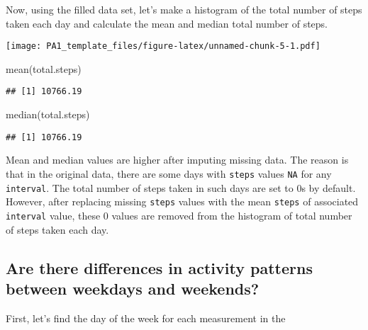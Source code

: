 \documentclass[
]{article}
\newenvironment{Shaded}{\begin{snugshade}}{\end{snugshade}}
\newcommand{\AttributeTok}[1]{\textcolor[rgb]{0.77,0.63,0.00}{#1}}
\newcommand{\DecValTok}[1]{\textcolor[rgb]{0.00,0.00,0.81}{#1}}
\newcommand{\FunctionTok}[1]{\textcolor[rgb]{0.00,0.00,0.00}{#1}}
\newcommand{\NormalTok}[1]{#1}
\newcommand{\OtherTok}[1]{\textcolor[rgb]{0.56,0.35,0.01}{#1}}
\newcommand{\SpecialCharTok}[1]{\textcolor[rgb]{0.00,0.00,0.00}{#1}}
\newcommand{\StringTok}[1]{\textcolor[rgb]{0.31,0.60,0.02}{#1}}
\begin{document}
Now, using the filled data set, let's make a histogram of the total
number of steps taken each day and calculate the mean and median total
number of steps.
\begin{Shaded}
\end{Shaded}
\texttt{[image: PA1\_template\_files/figure-latex/unnamed-chunk-5-1.pdf]}
\begin{Shaded}
\begin{Highlighting}[]
\FunctionTok{mean}\NormalTok{(total.steps)}
\end{Highlighting}
\end{Shaded}
\begin{verbatim}
## [1] 10766.19
\end{verbatim}
\begin{Shaded}
\begin{Highlighting}[]
\FunctionTok{median}\NormalTok{(total.steps)}
\end{Highlighting}
\end{Shaded}
\begin{verbatim}
## [1] 10766.19
\end{verbatim}
Mean and median values are higher after imputing missing data. The
reason is that in the original data, there are some days with
\texttt{steps} values \texttt{NA} for any \texttt{interval}. The total
number of steps taken in such days are set to 0s by default. However,
after replacing missing \texttt{steps} values with the mean
\texttt{steps} of associated \texttt{interval} value, these 0 values are
removed from the histogram of total number of steps taken each day.
\hypertarget{are-there-differences-in-activity-patterns-between-weekdays-and-weekends}{%
\subsection{Are there differences in activity patterns between weekdays
and
weekends?}\label{are-there-differences-in-activity-patterns-between-weekdays-and-weekends}}
First, let's find the day of the week for each measurement in the
\end{document}
